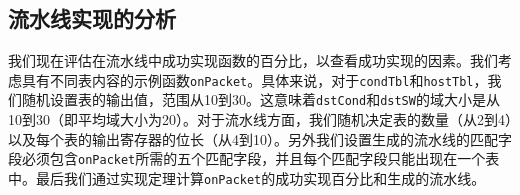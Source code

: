 \begin{table}[t]
\centering
{}

\vspace{2mm}
\caption{流水线的特征结果。}
\label{cap:tbl:table3}
\end{table}



\subsection{流水线实现的分析}

我们现在评估在流水线中成功实现函数的百分比，以查看成功实现的因素。我们考虑具有不同表内容的示例函数\texttt{onPacket}。具体来说，对于\texttt{condTbl}和\texttt{hostTbl}，我们随机设置表的输出值，范围从10到30。这意味着\texttt{dstCond}和\texttt{dstSW}的域大小是从10到30（即平均域大小为20）。对于流水线方面，我们随机决定表的数量（从2到4）以及每个表的输出寄存器的位长（从4到10）。另外我们设置生成的流水线的匹配字段必须包含\texttt{onPacket}所需的五个匹配字段，并且每个匹配字段只能出现在一个表中。最后我们通过实现定理计算\texttt{onPacket}的成功实现百分比和生成的流水线。



